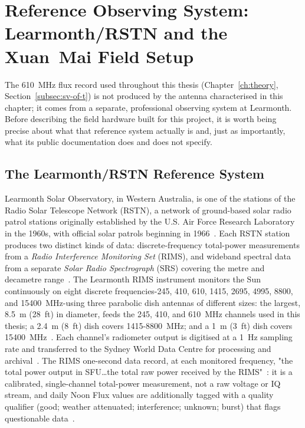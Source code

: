 \section{Reference Observing System: Learmonth/RSTN and the Xuan~Mai Field Setup}
\label{sec:reference-systems}

The \SI{610}{\mega\hertz} flux record used throughout this thesis
(Chapter~\ref{ch:theory}, Section~\ref{subsec:sv-of-t}) is not produced by the
antenna characterised in this chapter; it comes from a separate, professional
observing system at Learmonth. Before describing the field hardware built for
this project, it is worth being precise about what that reference system
actually is and, just as importantly, what its public documentation does and
does not specify.

\subsection{The Learmonth/RSTN Reference System}
\label{subsec:learmonth-hardware}

Learmonth Solar Observatory, in Western Australia, is one of the stations of
the Radio Solar Telescope Network (RSTN), a network of ground-based solar
radio patrol stations originally established by the U.S. Air Force Research
Laboratory in the 1960s, with official solar patrols beginning in
1966~\citep{rstn_overview}. Each RSTN station produces two distinct kinds of
data: discrete-frequency total-power measurements from a
\emph{Radio Interference Monitoring Set} (RIMS), and wideband spectral data
from a separate \emph{Solar Radio Spectrograph} (SRS) covering the metre and
decametre range~\citep{rstn_overview}. The Learmonth RIMS instrument monitors
the Sun continuously on eight discrete frequencies-245, 410, 610, 1415, 2695,
4995, 8800, and \SI{15400}{\mega\hertz}-using three parabolic dish antennas
of different sizes: the largest, \SI{8.5}{\metre} (28~ft) in diameter, feeds
the \SI{245}{}, \SI{410}{}, and \SI{610}{\mega\hertz} channels used in this
thesis; a \SI{2.4}{\metre} (8~ft) dish covers 1415-\SI{8800}{\mega\hertz}; and
a \SI{1}{\metre} (3~ft) dish covers \SI{15400}{\mega\hertz}~\citep{sws_rims_metadata}.
Each channel's radiometer output is digitised at a \SI{1}{\hertz} sampling
rate and transferred to the Sydney World Data Centre for processing and
archival~\citep{sws_rims_metadata}. The RIMS one-second data record, at each
monitored frequency, "the total power output in SFU\ldots the total raw power
received by the RIMS"~\citep{rstn_overview}: it is a calibrated, single-channel
total-power measurement, not a raw voltage or IQ stream, and daily Noon Flux
values are additionally tagged with a quality qualifier (good; weather
attenuated; interference; unknown; burst) that flags questionable
data~\citep{rstn_overview}.


